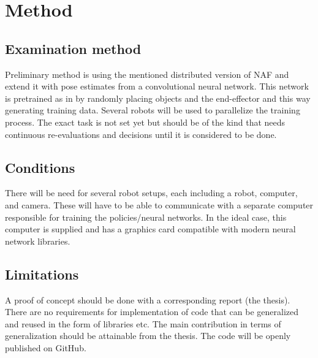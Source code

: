 \section{Method}

\subsection{Examination method}

Preliminary method is using the mentioned distributed version of NAF and extend
it with pose estimates from a convolutional neural network. This network is
pretrained as in \cite{yahya2016collective} by randomly placing objects and the
end-effector and this way generating training data. Several robots will be used
to parallelize the training process. The exact task is not set yet but should be
of the kind that needs continuous re-evaluations and decisions until it is
considered to be done.

\subsection{Conditions}

There will be need for several robot setups, each including a robot,
computer, and camera. These will have to be able to communicate with a separate
computer responsible for training the policies/neural networks. In the ideal
case, this computer is supplied and has a graphics card compatible with modern
neural network libraries.

\subsection{Limitations}

A proof of concept should be done with a corresponding report (the thesis).
There are no requirements for implementation of code that can be generalized
and reused in the form of libraries etc. The main contribution in terms of
generalization should be attainable from the thesis. The code will be openly
published on GitHub.
